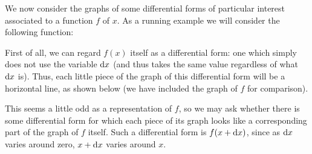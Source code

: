 \documentclass[12pt]{amsart}
\begin{document}
We now consider the graphs of some differential forms of particular interest associated to a function $f$ of $x$.
As a running example we will consider the following function:
\def\axes{
    \draw[<->] (-5,0) -- (5,0);
    \draw[<->] (0,-2) -- (0,2);
    \foreach \x in {1,2,3,4} \draw (\x,.2) -- (\x,-.2);
    \foreach \x in {1,2,3,4} \draw (-\x,.2) -- (-\x,-.2);
}
\def\fctn#1{\draw[#1] (-5,.3) to[out=30,in=170] (-4,1) to[out=-10,in=110] (-2,-1.2) to[out=-70,in=-130] (1,.2) to[out=50,in=120] (5,-.5);}
\def\heights{-4/1cm/-.05,-3/.55cm/-.3,-2/-1.2cm/-.6,-1/-1.5cm/.15,0/-.85cm/.28,1/.2cm/.32,2/.81cm/.08,3/.85cm/-.05,4/.47cm/-.18}
\begin{center}
\end{center}
First of all, we can regard $f(x)$ itself as a differential form: one which simply does not use the variable ${\mathrm{d} x}$ (and thus takes the same value regardless of what ${\mathrm{d} x}$ is).
Thus, each little piece of the graph of this differential form will be a horizontal line, as shown below (we have included the graph of $f$ for comparison).
\begin{center}
\end{center}
This seems a little odd as a representation of $f$, so we may ask whether there is some differential form for which each piece of its graph looks like a corresponding part of the graph of $f$ itself.
Such a differential form is $f(x+{\mathrm{d} x})$, since as ${\mathrm{d} x}$ varies around zero, $x+{\mathrm{d} x}$ varies around $x$.
\begin{center}
\end{center}
\end{document}
